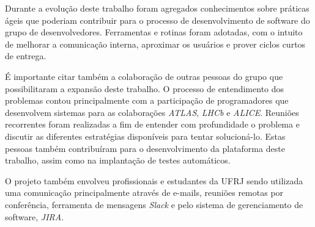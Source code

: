 Durante a evolução deste trabalho foram agregados conhecimentos sobre práticas ágeis que poderiam contribuir para o processo de desenvolvimento de software do grupo de desenvolvedores. Ferramentas e rotinas foram adotadas, com o intuito de melhorar a comunicação interna, aproximar os usuários e prover ciclos curtos de entrega.

É importante citar também a colaboração de outras pessoas do grupo que possibilitaram a expansão deste trabalho. O processo de entendimento dos problemas contou principalmente com a participação de programadores que desenvolvem sistemas para as colaborações \emph{ATLAS}, \emph{LHCb} e \emph{ALICE}. Reuniões recorrentes foram realizadas a fim de entender com profundidade o problema e discutir as diferentes estratégias disponíveis para tentar solucioná-lo. Estas pessoas também contribuíram para o desenvolvimento da plataforma deste trabalho, assim como na implantação de testes automáticos.

O projeto também envolveu profissionais e estudantes da UFRJ sendo utilizada uma comunicação principalmente através de e-mails, reuniões remotas por conferência, ferramenta de mensagens \emph{Slack} e pelo sistema de gerenciamento de software, \emph{JIRA}.
